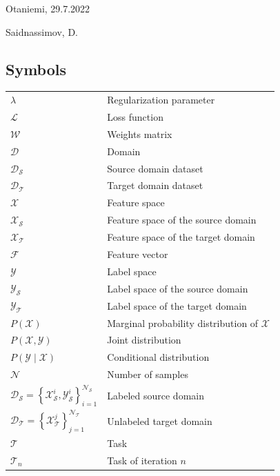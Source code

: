 \documentclass[english, 12pt, a4paper, elec, utf8, a-1b, online]{aaltothesis}
\begin{document}
\vspace{5cm}
Otaniemi, 29.7.2022

\vspace{5mm}
{\hfill Saidnassimov, D.\hspace{1cm}}

\newpage


\thesistableofcontents

\cleardoublepage
\listoffigures
\cleardoublepage

\listoftables
{} 
\cleardoublepage


\subsection*{Symbols}

\begin{tabular}{ll}
$\lambda $		& Regularization parameter\\
$\mathcal{L}$	& Loss function  \\
$\mathcal{W}$	& Weights matrix  \\
$\mathcal{D}$	& Domain  \\
$\mathcal{D_S}$	& Source domain dataset \\
$\mathcal{D_T}$	& Target domain dataset  \\
$\mathcal{X}$	& Feature space  \\
$\mathcal{X_S}$	& Feature space of the source domain \\
$\mathcal{X_T}$	& Feature space of the target domain \\
$\mathcal{F}$	& Feature vector\\
$\mathcal{Y}$	& Label space  \\
$\mathcal{Y_S}$	& Label space of the source domain \\
$\mathcal{Y_T}$	& Label space of the target domain \\
$P(\mathcal{X})$	& Marginal probability distribution of $\mathcal{X}$  \\
$P(\mathcal{X}, \mathcal{Y})$	& Joint distribution   \\
$P(\mathcal{Y} \mid \mathcal{X})$	& Conditional distribution  \\
$\mathcal{N}$	& Number of samples\\
$\mathcal{D}_{\mathcal{S}}=\left\{\mathcal{X}_{\mathcal{S}}^{i}, \mathcal{Y}_{\mathcal{S}}^{i}\right\}_{i=1}^{\mathcal{N}_{\mathcal{S}}}$	& Labeled source domain  \\

$\mathcal{D}_{\mathcal{T}}=\left\{\mathcal{X}_{\mathcal{T}}^{j}\right\}_{j=1}^{\mathcal{N}_{\mathcal{T}}}$		& Unlabeled target domain  \\

$\mathcal{T}$	& Task  \\
$\mathcal{T}_{n}$	& Task of iteration $n$  \\
\end{tabular}
\end{document}
